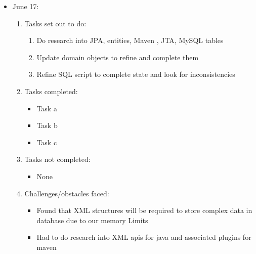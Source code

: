 	\begin{itemize}
		\item June 17:
		\begin{enumerate}
			\item Tasks set out to do:
			\begin{enumerate}
				\item Do research into JPA, entities, Maven , JTA, MySQL tables
				\item Update domain objects to refine and complete them
				\item Refine SQL script to complete state and look for inconsistencies
			\end{enumerate}
			\item Tasks completed:
			\begin{itemize}
				\item Task a
				\item Task b
				\item Task c
			\end{itemize}
			\item Tasks not completed:
			\begin{itemize}
				\item None
			\end{itemize}
			\item Challenges/obstacles faced:
			\begin{itemize}
				\item Found that XML structures will be required to store complex data in database due to our memory Limits
				\item Had to do research into XML apis for java and associated plugins for maven
			\end{itemize}			
		\end{enumerate}
	\end{itemize}
	
